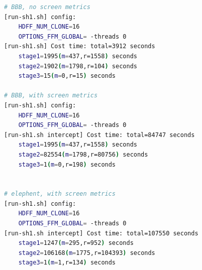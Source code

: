 \begin{lstlisting}[language=bash]
# BBB, no screen metrics
[run-sh1.sh] config:
    HDFF_NUM_CLONE=16
    OPTIONS_FFM_GLOBAL= -threads 0
[run-sh1.sh] Cost time: total=3912 seconds
    stage1=1995(m=437,r=1558) seconds
    stage2=1902(m=1798,r=104) seconds
    stage3=15(m=0,r=15) seconds

# BBB, with screen metrics
[run-sh1.sh] config:
    HDFF_NUM_CLONE=16
    OPTIONS_FFM_GLOBAL= -threads 0
[run-sh1.sh intercept] Cost time: total=84747 seconds
    stage1=1995(m=437,r=1558) seconds
    stage2=82554(m=1798,r=80756) seconds
    stage3=1(m=0,r=198) seconds


# elephent, with screen metrics
[run-sh1.sh] config:
    HDFF_NUM_CLONE=16
    OPTIONS_FFM_GLOBAL= -threads 0
[run-sh1.sh intercept] Cost time: total=107550 seconds
    stage1=1247(m=295,r=952) seconds
    stage2=106168(m=1775,r=104393) seconds
    stage3=1(m=1,r=134) seconds


\end{lstlisting}




